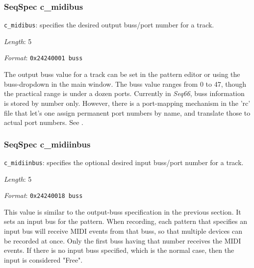 \subsubsection{SeqSpec c\_midibus}
\label{subsubsec:midi_format_track_seqspec_midibus}


   \begin{description}
      \item \texttt{c\_midibus}:
         specifies the desired output buss/port number for a track.
      \item \textsl{Length}: 5
      \item \textsl{Format}: \texttt{0x24240001 buss}
   \end{description}

   The output buss value for a track can be set in the pattern editor or using the
   buss-dropdown in the main window.
   The buss value ranges from 0 to 47, though the practical range is under a
   dozen ports.  Currently in \textsl{Seq66}, buss information is stored by
   number only.  However, there is a port-mapping mechanism in the 'rc' file
   that let's one assign permanent port numbers by name, and translate those to
   actual port numbers.
   See .

\subsubsection{SeqSpec c\_midiinbus}
\label{subsubsec:midi_format_track_seqspec_midiinbus}


   \begin{description}
      \item \texttt{c\_midiinbus}:
         specifies the optional desired input buss/port number for a track.
      \item \textsl{Length}: 5
      \item \textsl{Format}: \texttt{0x24240018 buss}
   \end{description}

   This value is similar to the output-buss specification in the previous
   section. It sets an input bus for the pattern. When recording, each
   pattern that specifies an input bus will receive MIDI events from that
   buss, so that multiple devices can be recorded at once.
   Only the first buss having that number receives the MIDI events.
   If there is no input buss specified, which is the normal case, then
   the input is considered "Free".

